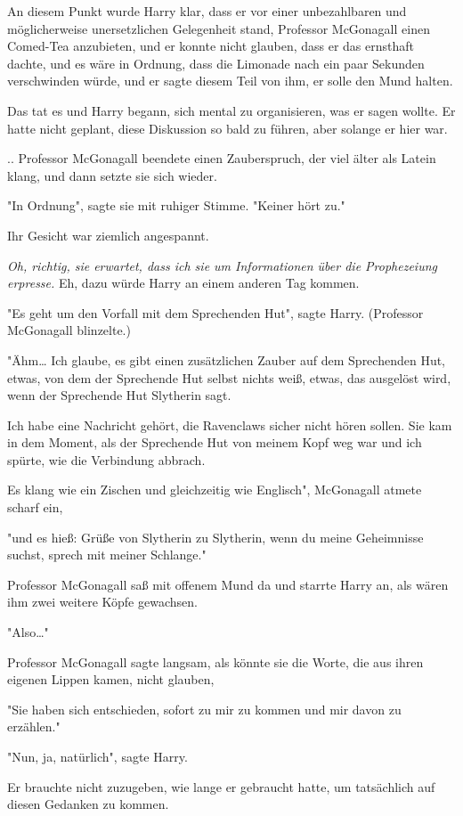 {An diesem Punkt wurde Harry klar, dass er vor einer unbezahlbaren und möglicherweise unersetzlichen Gelegenheit stand, Professor McGonagall einen Comed-Tea anzubieten, und er konnte nicht glauben, dass er das ernsthaft dachte, und es wäre in Ordnung, dass die Limonade nach ein paar Sekunden verschwinden würde, und er sagte diesem Teil von ihm, er solle den Mund halten.

Das tat es und Harry begann, sich mental zu organisieren, was er sagen wollte. Er hatte nicht geplant, diese Diskussion so bald zu führen, aber solange er hier war.

.. Professor McGonagall beendete einen Zauberspruch, der viel älter als Latein klang, und dann setzte sie sich wieder.

"In Ordnung", sagte sie mit ruhiger Stimme. "Keiner hört zu."

Ihr Gesicht war ziemlich angespannt.

\emph{Oh, richtig, sie erwartet, dass ich sie um Informationen über die Prophezeiung erpresse.} Eh, dazu würde Harry an einem anderen Tag kommen.

"Es geht um den Vorfall mit dem Sprechenden Hut", sagte Harry. (Professor McGonagall blinzelte.)

"Ähm… Ich glaube, es gibt einen zusätzlichen Zauber auf dem Sprechenden Hut, etwas, von dem der Sprechende Hut selbst nichts weiß, etwas, das ausgelöst wird, wenn der Sprechende Hut Slytherin sagt.

Ich habe eine Nachricht gehört, die Ravenclaws sicher nicht hören sollen. Sie kam in dem Moment, als der Sprechende Hut von meinem Kopf weg war und ich spürte, wie die Verbindung abbrach.

Es klang wie ein Zischen und gleichzeitig wie Englisch", McGonagall atmete scharf ein,

"und es hieß: Grüße von Slytherin zu Slytherin, wenn du meine Geheimnisse suchst, sprech mit meiner Schlange."

Professor McGonagall saß mit offenem Mund da und starrte Harry an, als wären ihm zwei weitere Köpfe gewachsen.

"Also…"

Professor McGonagall sagte langsam, als könnte sie die Worte, die aus ihren eigenen Lippen kamen, nicht glauben,

"Sie haben sich entschieden, sofort zu mir zu kommen und mir davon zu erzählen."

"Nun, ja, natürlich", sagte Harry.

Er brauchte nicht zuzugeben, wie lange er gebraucht hatte, um tatsächlich auf diesen Gedanken zu kommen.

}
